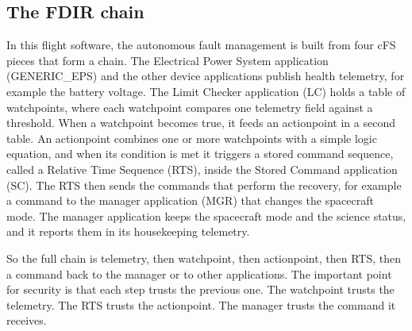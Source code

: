 \documentclass[conference,letterpaper,10pt]{IEEEtran}
\begin{document}
\subsection{The FDIR chain}
In this flight software, the autonomous fault management is built from four cFS pieces that form a chain. The Electrical Power System application (GENERIC\_EPS) and the other device applications publish health telemetry, for example the battery voltage. The Limit Checker application (LC) holds a table of watchpoints, where each watchpoint compares one telemetry field against a threshold. When a watchpoint becomes true, it feeds an actionpoint in a second table. An actionpoint combines one or more watchpoints with a simple logic equation, and when its condition is met it triggers a stored command sequence, called a Relative Time Sequence (RTS), inside the Stored Command application (SC). The RTS then sends the commands that perform the recovery, for example a command to the manager application (MGR) that changes the spacecraft mode. The manager application keeps the spacecraft mode and the science status, and it reports them in its housekeeping telemetry.

So the full chain is telemetry, then watchpoint, then actionpoint, then RTS, then a command back to the manager or to other applications. The important point for security is that each step trusts the previous one. The watchpoint trusts the telemetry. The RTS trusts the actionpoint. The manager trusts the command it receives.
\end{document}
